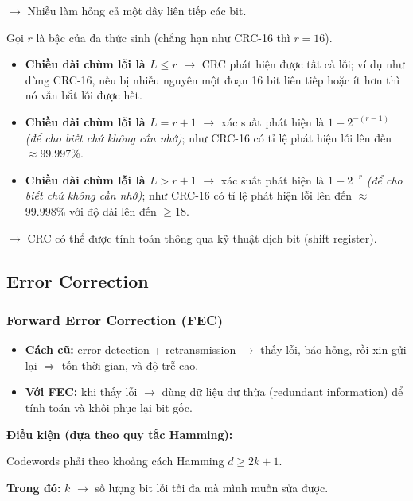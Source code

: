 \noindent
$\rightarrow$ Nhiễu làm hỏng cả một dây liên tiếp các bit.
\medskip

\noindent
Gọi $r$ là bậc của đa thức sinh (chẳng hạn như CRC-16 thì $r = 16$).

\begin{itemize}
    \item \textbf{Chiều dài chùm lỗi là $L \leq r$} $\rightarrow$ CRC phát hiện được tất cả lỗi; ví dụ như dùng CRC-16, nếu bị nhiễu nguyên một đoạn 16 bit liên tiếp hoặc ít hơn thì nó vẫn bắt lỗi được hết.
    \item \textbf{Chiều dài chùm lỗi là $L = r+1$} $\rightarrow$ xác suất phát hiện là $1-2^{-(r-1)}$ \textit{(để cho biết chứ không cần nhớ)}; như CRC-16 có tỉ lệ phát hiện lỗi lên đến $\approx$99.997\%.
    \item \textbf{Chiều dài chùm lỗi là $L > r+1$} $\rightarrow$ xác suất phát hiện là $1-2^{-r}$ \textit{(để cho biết chứ không cần nhớ)}; như CRC-16 có tỉ lệ phát hiện lỗi lên đến $\approx$99.998\% với độ dài lên đến $\geq 18$.
\end{itemize}
\medskip

\noindent
$\rightarrow$ CRC có thể được tính toán thông qua kỹ thuật dịch bit (shift register).
\medskip

\subsection{Error Correction}

\subsubsection{Forward Error Correction (FEC)}

\begin{itemize}
    \item \textbf{Cách cũ:} error detection + retransmission $\rightarrow$ thấy lỗi, báo hỏng, rồi xin gửi lại $\Rightarrow$ tốn thời gian, và độ trễ cao.
    \item \textbf{Với FEC:} khi thấy lỗi $\rightarrow$ dùng dữ liệu dư thừa (redundant information) để tính toán và khôi phục lại bit gốc.
\end{itemize}
\medskip

\noindent
\textbf{Điều kiện (dựa theo quy tắc Hamming):}
\medskip

\noindent
Codewords phải theo khoảng cách Hamming $d \geq 2k + 1$.

\textbf{Trong đó:} $k$ $\rightarrow$ số lượng bit lỗi tối đa mà mình muốn sửa được.
\medskip

